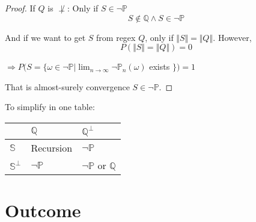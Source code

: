 \documentclass[12pt,a4paper]{article}
\begin{document}
\begin{CJK}{UTF8}{bsmi}
\begin{enumerate}
\begin{proof}
                  If $Q$ is $\not\perp$: Only if $S \in \neg\mathbb{P}$
                  \begin{equation}
                      S \not\in \mathbb{Q} \land S \in \neg\mathbb{P}
                  \end{equation}

                  And if we want to get $S$ from regex $Q$, only if
                  $\mathbin\Vert S \mathbin\Vert = \mathbin\Vert Q \mathbin\Vert$.
                  However,
                  $$P(\mathbin\Vert S \mathbin\Vert = \mathbin\Vert Q \mathbin\Vert)=0$$
                  \begin{center}
                      $\Rightarrow P(S = \{\omega \in \neg \mathbb{P} | \lim_{n \to \infty} \neg \mathbb{P}_{n}(\omega)$ exists $\}) = 1$
                  \end{center}

                  That is almost-surely convergence $S \in \neg\mathbb{P}$.
              \end{proof}

              To simplify in one table:\\
              \begin{center}
                  \begin{tabularx}{6cm} {
                          | >{\raggedright\arraybackslash}X
                          | >{\centering\arraybackslash}X
                          | >{\raggedleft\arraybackslash}X |}
                      \hline
                      \mbox{}              & $\mathbb{Q}$     & $\mathbb{Q}^{\perp}$                \\
                      \hline
                      $\mathbb{S}$         & Recursion        & $\neg\mathbb{P}$                    \\
                      \hline
                      $\mathbb{S}^{\perp}$ & $\neg\mathbb{P}$ & $\neg\mathbb{P}$ or    $\mathbb{Q}$ \\
                      \hline
                  \end{tabularx}
              \end{center}
    \end{enumerate}

    \section{Outcome}
    

\end{CJK}
\end{document}
